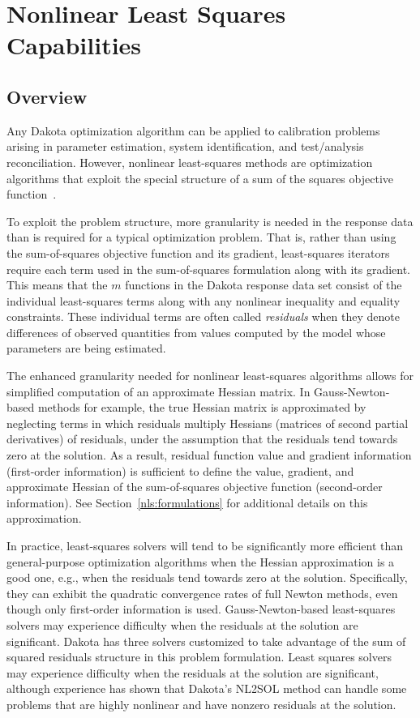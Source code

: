 \chapter{Nonlinear Least Squares Capabilities}\label{nls}
\section{Overview}\label{nls:overview}
Any Dakota optimization algorithm can be applied to calibration
problems arising in parameter estimation, system identification, and
test/analysis reconciliation.  However, nonlinear least-squares
methods are optimization algorithms that exploit the special structure
of a sum of the squares objective function~\cite{Gil81}.

To exploit the problem structure, more granularity is needed in the
response data than is required for a typical optimization problem.
That is, rather than using the sum-of-squares objective function and
its gradient, least-squares iterators require each term used in the
sum-of-squares formulation along with its gradient. This means that
the $m$ functions in the Dakota response data set consist of the
individual least-squares terms along with any nonlinear inequality and
equality constraints. These individual terms are often called
\emph{residuals} when they denote differences of observed quantities
from values computed by the model whose parameters are being
estimated.

The enhanced granularity needed for nonlinear least-squares algorithms
allows for simplified computation of an approximate Hessian matrix.
In Gauss-Newton-based methods for example, the true Hessian matrix is
approximated by neglecting terms in which residuals multiply Hessians
(matrices of second partial derivatives) of residuals, under the
assumption that the residuals tend towards zero at the solution. As a
result, residual function value and gradient information (first-order
information) is sufficient to define the value, gradient, and
approximate Hessian of the sum-of-squares objective function
(second-order information). See Section~\ref{nls:formulations} for
additional details on this approximation.

In practice, least-squares solvers will tend to be significantly more
efficient than general-purpose optimization algorithms when the
Hessian approximation is a good one, e.g., when the residuals tend
towards zero at the solution. Specifically, they can exhibit the
quadratic convergence rates of full Newton methods, even though only
first-order information is used. Gauss-Newton-based least-squares
solvers may experience difficulty when the residuals at the solution
are significant.  Dakota has three solvers customized to take
advantage of the sum of squared residuals structure in this problem
formulation. Least squares solvers may experience difficulty when the
residuals at the solution are significant, although experience has
shown that Dakota's NL2SOL method can handle some problems that are
highly nonlinear and have nonzero residuals at the solution.


